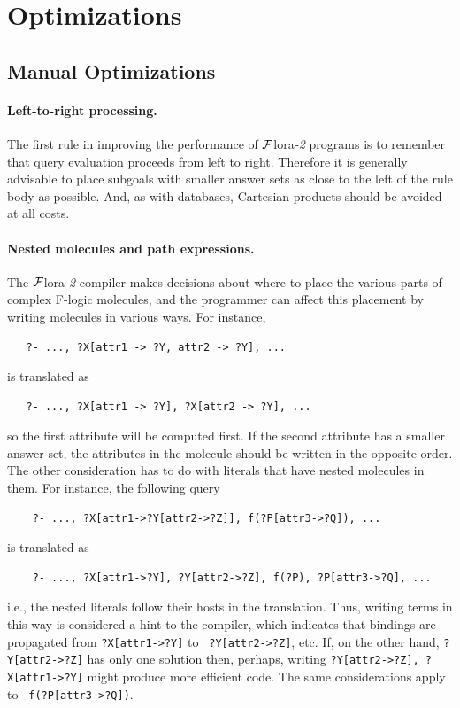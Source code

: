 \documentclass[11pt]{article}
\newcommand{\FLORA}{{\mbox{\sc ${\cal F}${lora}\rm\emph{-2}}}\xspace}
\begin{document}
\section{Optimizations}

\subsection{Manual Optimizations}

\paragraph{Left-to-right processing.}
The first rule in improving the performance of \FLORA programs is to
remember that query evaluation proceeds from left to right. Therefore it is
generally advisable to place subgoals with smaller answer sets as close to
the left of the rule body as possible. And, as with databases, Cartesian
products should be avoided at all costs.

\paragraph{Nested molecules and path expressions.}
The \FLORA compiler makes decisions about
where to place the various parts of complex F-logic molecules, and the
programmer can affect this placement by writing molecules in various ways.
For instance,
\begin{verbatim}
   ?- ..., ?X[attr1 -> ?Y, attr2 -> ?Y], ...
\end{verbatim}
is translated as
\begin{verbatim}
   ?- ..., ?X[attr1 -> ?Y], ?X[attr2 -> ?Y], ...  
\end{verbatim}
so the first attribute will be computed first. If the second attribute has
a smaller answer set, the attributes in the molecule should be written in
the opposite order. The other consideration has to do with literals that
have nested molecules in them. For instance, the following query
\begin{verbatim}
    ?- ..., ?X[attr1->?Y[attr2->?Z]], f(?P[attr3->?Q]), ...
\end{verbatim}
is translated as
\begin{verbatim}
    ?- ..., ?X[attr1->?Y], ?Y[attr2->?Z], f(?P), ?P[attr3->?Q], ...
\end{verbatim}
i.e., the nested literals follow their hosts in the translation.
Thus, writing terms in this way is considered a hint to the compiler, which
indicates that bindings are propagated from {\tt ?X[attr1->?Y]} to {\tt
  ?Y[attr2->?Z]}, etc. If, on the other hand, {\tt ?Y[attr2->?Z]} has only one
solution then, perhaps, writing {\tt ?Y[attr2->?Z], ?X[attr1->?Y]} might
produce more efficient code.  The same considerations apply to {\tt
  f(?P[attr3->?Q])}.
\end{document}
